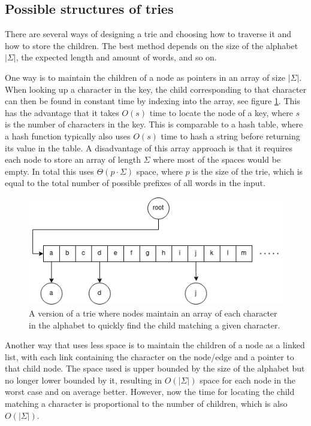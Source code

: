 \subsection{Possible structures of tries} \label{sec:posStrucOfTrie}

There are several ways of designing a trie and choosing how to traverse it and how to store the children. The best method depends on the size of the alphabet $|\Sigma|$, the expected length and amount of words, and so on. 

One way is to maintain the children of a node as pointers in an array of size $|\Sigma|$. When looking up a character in the key, the child corresponding to that character can then be found in constant time by indexing into the array, see figure \ref{fig:trie_array}. This has the advantage that it takes $O(s)$ time to locate the node of a key, where $s$ is the number of characters in the key. This is comparable to a hash table, where a hash function typically also uses $O(s)$ time to hash a string before returning its value in the table. A disadvantage of this array approach is that it requires each node to store an array of length $\Sigma$ where most of the spaces would be empty. In total this uses $\Theta(p\cdot\Sigma)$ space, where $p$ is the size of the trie, which is equal to the total number of possible prefixes of all words in the input. 

\begin{figure}[ht!]
    \centering
    \includegraphics[width=.9\textwidth]{LaTeX/Figures/Tries/Trie_array.png}
    \caption{A version of a trie where nodes maintain an array of each character in the alphabet to quickly find the child matching a given character. }
    \label{fig:trie_array}
\end{figure}

Another way that uses less space is to maintain the children of a node as a linked list, with each link containing the character on the node/edge and a pointer to that child node. The space used is upper bounded by the size of the alphabet but no longer lower bounded by it, resulting in $O(|\Sigma|)$ space for each node in the worst case and on average better. However, now the time for locating the child matching a character is proportional to the number of children, which is also $O(|\Sigma|)$. 

